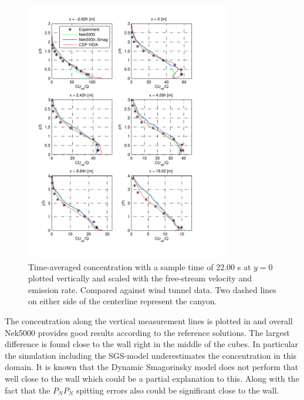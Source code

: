 \newpage
\begin{figure}[h]
    \centering
    \includegraphics[width=0.8\textwidth]{Figures/NekcV_all.pdf}
    \caption{Time-averaged concentration with a sample time of $22.00$ s at $y = 0$ plotted
    vertically and scaled 
    with the free-stream velocity and emission rate. Compared against wind tunnel data.
Two dashed lines on either side of the centerline represent the canyon.}
    \label{fig:cVall}
\end{figure}
The concentration along the vertical measurement lines is plotted in  and overall 
Nek5000 provides good results according to the reference solutions. The largest difference is found close 
to the wall right in the middle of the cubes. In particular the simulation including the SGS-model 
underestimates the concentration in this domain. It is known that the Dynamic Smagorinsky model does not 
perform that well close to the wall which could be a partial explanation to this. Along with the fact that 
the $P_NP_N$ spitting errors also could be significant close to the wall.




